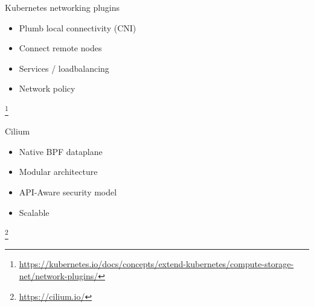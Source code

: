 \documentclass[black,white]{beamer}
\newcommand\blfootnote[1]{%
  \begingroup
  \renewcommand\thefootnote{}\footnote{#1}%
  \addtocounter{footnote}{-1}%
  \endgroup
}
\DeclareRobustCommand{\#}{\adjustbox{valign=B,totalheight=.57\baselineskip}{\oldhash}}%
\begin{document}
    \begin{frame}{Kubernetes networking plugins}
        \vfill
        \begin{table}
            \begin{subtable}[l]{0.6\textwidth}
                \begin{itemize}
                    \item Plumb local connectivity (CNI) \medskip
                    \item Connect remote nodes \medskip
                    \item Services / loadbalancing \medskip
                    \item Network policy \medskip
                \end{itemize}
            \end{subtable}
            \begin{subtable}[r]{0.35\textwidth}
                \begin{figure}
                    
                \end{figure}
            \end{subtable}
        \end{table}
        \vfill
        \blfootnote{{\tiny \url{https://kubernetes.io/docs/concepts/extend-kubernetes/compute-storage-net/network-plugins/}}}
    \end{frame}

    \begin{frame}{Cilium}
        \vfill
        \begin{table}
            \begin{subtable}[l]{0.45\textwidth}
                \begin{itemize} \item Native BPF dataplane \medskip
                    \item Modular architecture \medskip
                    \item API-Aware security model \medskip
                    \item Scalable \medskip
                \end{itemize}
            \end{subtable}
            \begin{subtable}[r]{0.5\textwidth}
                \begin{figure}
                    
                \end{figure}
            \end{subtable}
        \end{table}
        \vfill
        \blfootnote{{\tiny \url{https://cilium.io/}}}
    \end{frame}
\end{document}
